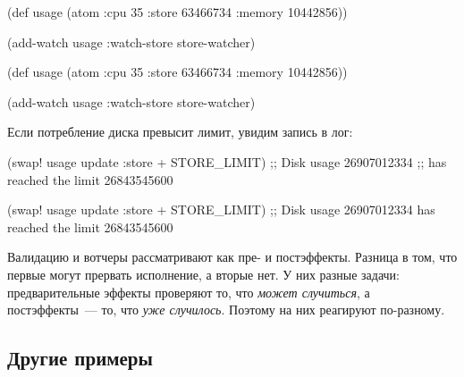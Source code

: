 \ifx\DEVICETYPE\MOBILE

\begin{english}
  \begin{clojure}
(def usage
  (atom {:cpu 35
         :store 63466734
         :memory 10442856}))

(add-watch usage
  :watch-store store-watcher)
  \end{clojure}
\end{english}

\else

\begin{english}
  \begin{clojure}
(def usage
  (atom {:cpu 35
         :store 63466734
         :memory 10442856}))

(add-watch usage :watch-store store-watcher)
  \end{clojure}
\end{english}

\fi

\noindent
Если потребление диска превысит лимит, увидим запись в лог:

\ifx\DEVICETYPE\MOBILE

\begin{english}
  \begin{clojure}
(swap! usage update :store + STORE_LIMIT)
;; Disk usage 26907012334
;; has reached the limit 26843545600
  \end{clojure}
\end{english}

\else

\begin{english}
  \begin{clojure}
(swap! usage update :store + STORE_LIMIT)
;; Disk usage 26907012334 has reached the limit 26843545600
  \end{clojure}
\end{english}

\fi

Валидацию и вотчеры рассматривают как пре- и постэффекты. Разница в том, что
первые могут прервать исполнение, а вторые нет. У них разные задачи:
предварительные эффекты проверяют то, что \emph{может случиться}, а
постэффекты~--- то, что \emph{уже случилось}. Поэтому на них реагируют
по-разному.

\subsection{Другие примеры}


